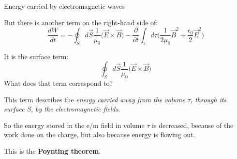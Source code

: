 \begin{frame}{Energy carried by electromagnetic waves}

But there is another term on the right-hand side of:
\begin{equation*}
  \frac{dW}{dt} =
     - \oint_{S} d\vec{S} \frac{1}{\mu_0} \Big( \vec{E} \times \vec{B} \Big)
     - \frac{\partial}{\partial t} \int_{\tau} d\tau  \Big( \frac{1}{2\mu_0} \vec{B}^2 + \frac{\epsilon_0}{2} \vec{E}^2 \Big)
\end{equation*}

It is the surface term:
\begin{equation*}
     \oint_{S} d\vec{S} \frac{1}{\mu_0} \Big( \vec{E} \times \vec{B} \Big)
\end{equation*}
What does that term correspond to?\\

\vspace{0.2cm}

This term describes the {\em energy carried away from the volume $\tau$,
through its surface S, by the electromagnetic fields}.\\

\vspace{0.2cm}

So the energy stored in the e/m field in volume $\tau$ is decreased, because of the
work done on the charge, but also because energy is flowing out.\\

\vspace{0.2cm}

This is the {\bf Poynting theorem}.

\end{frame}
